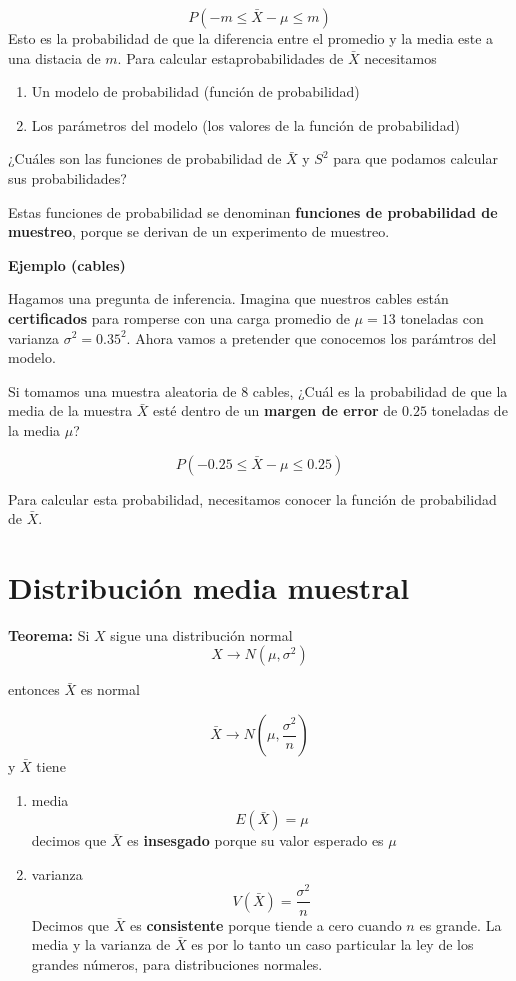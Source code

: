 \documentclass[
]{book}
\begin{document}
\[P(-m \leq \bar{X}-\mu \leq m) \]
Esto es la probabilidad de que la diferencia entre el promedio y la media este a una distacia de \(m\).
Para calcular estaprobabilidades de \(\bar{X}\) necesitamos

\begin{enumerate}
\def\labelenumi{\arabic{enumi}.}
\item
  Un modelo de probabilidad (función de probabilidad)
\item
  Los parámetros del modelo (los valores de la función de probabilidad)
\end{enumerate}

¿Cuáles son las funciones de probabilidad de \(\bar{X}\) y \(S^2\) para que podamos calcular sus probabilidades?

Estas funciones de probabilidad se denominan \textbf{funciones de probabilidad de muestreo}, porque se derivan de un experimento de muestreo.

\textbf{Ejemplo (cables)}

Hagamos una pregunta de inferencia. Imagina que nuestros cables están \textbf{certificados} para romperse con una carga promedio de \(\mu = 13\) toneladas con varianza \(\sigma^2=0.35^2\). Ahora vamos a pretender que conocemos los parámtros del modelo.

Si tomamos una muestra aleatoria de \(8\) cables, ¿Cuál es la probabilidad de que la media de la muestra \(\bar{X}\) esté dentro de un \textbf{margen de error} de \(0.25\) toneladas de la media \(\mu\)?

\[P(- 0.25\leq \bar{X}-\mu \leq 0.25)\]

Para calcular esta probabilidad, necesitamos conocer la función de probabilidad de \(\bar{X}\).

\hypertarget{distribuciuxf3n-media-muestral}{%
\section{Distribución media muestral}\label{distribuciuxf3n-media-muestral}}

\textbf{Teorema:} Si \(X\) sigue una distribución normal \[X \rightarrow N(\mu, \sigma^2)\]

entonces \(\bar{X}\) es normal

\[\bar{X} \rightarrow N(\mu, \frac{\sigma^2}{n})\]
y \(\bar{X}\) tiene

\begin{enumerate}
\def\labelenumi{\arabic{enumi})}
\item
  media
  \[E(\bar{X})=\mu\]
  decimos que \(\bar{X}\) es \textbf{insesgado} porque su valor esperado es \(\mu\)
\item
  varianza
  \[V(\bar{X})=\frac{\sigma^2}{n}\]
  Decimos que \(\bar{X}\) es \textbf{consistente} porque tiende a cero cuando \(n\) es grande. La media y la varianza de \(\bar{X}\) es por lo tanto un caso particular la ley de los grandes números, para distribuciones normales.
\end{enumerate}
\end{document}
